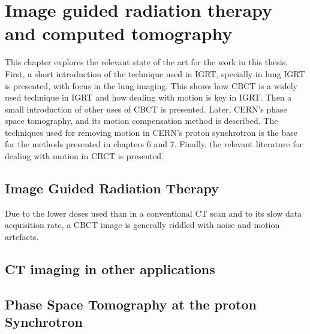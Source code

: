 \chapter{Image guided radiation therapy and computed tomography}\label{ch:soa}

This chapter explores the relevant state of the art for the work in this thesis. First, a short introduction of the technique used in IGRT, specially in lung IGRT is presented, with focus in the lung imaging. This shows how CBCT is a widely used technique in IGRT and how dealing with motion is key in IGRT. Then a small introduction of other uses of CBCT is presented. Later, CERN's phase space tomography, and its motion compensation method is described. The techniques used for removing motion in CERN's proton synchrotron is the base for the methods presented in chapters 6 and 7. Finally, the relevant literature for dealing with motion in CBCT is presented.


\section{Image Guided Radiation Therapy}


Due to the lower doses used than in a conventional CT scan and to its slow data acquisition rate, a CBCT image is generally riddled with noise and motion artefacts. 
\section{CT imaging in other applications}

\section{Phase Space Tomography at the proton Synchrotron}

